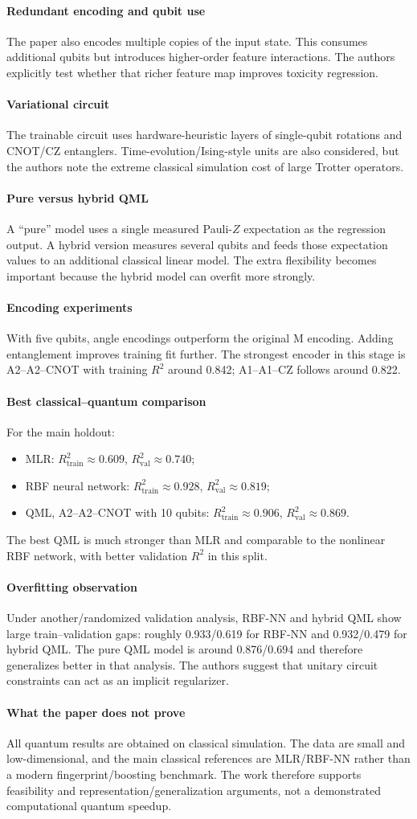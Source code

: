 \documentclass[11pt]{article}
\newcommand{\reviewfield}[2]{\paragraph{#1}#2}
\begin{document}
\reviewfield{Redundant encoding and qubit use}{
The paper also encodes multiple copies of the input state. This consumes additional qubits but introduces higher-order feature interactions. The authors explicitly test whether that richer feature map improves toxicity regression.
}

\reviewfield{Variational circuit}{
The trainable circuit uses hardware-heuristic layers of single-qubit rotations and CNOT/CZ entanglers. Time-evolution/Ising-style units are also considered, but the authors note the extreme classical simulation cost of large Trotter operators.
}

\reviewfield{Pure versus hybrid QML}{
A ``pure'' model uses a single measured Pauli-$Z$ expectation as the regression output. A hybrid version measures several qubits and feeds those expectation values to an additional classical linear model. The extra flexibility becomes important because the hybrid model can overfit more strongly.
}

\reviewfield{Encoding experiments}{
With five qubits, angle encodings outperform the original M encoding. Adding entanglement improves training fit further. The strongest encoder in this stage is A2--A2--CNOT with training $R^2$ around 0.842; A1--A1--CZ follows around 0.822.
}

\reviewfield{Best classical--quantum comparison}{
For the main holdout:
\begin{itemize}
    \item MLR: $R^2_{\mathrm{train}}\approx0.609$, $R^2_{\mathrm{val}}\approx0.740$;
    \item RBF neural network: $R^2_{\mathrm{train}}\approx0.928$, $R^2_{\mathrm{val}}\approx0.819$;
    \item QML, A2--A2--CNOT with 10 qubits: $R^2_{\mathrm{train}}\approx0.906$, $R^2_{\mathrm{val}}\approx0.869$.
\end{itemize}
The best QML is much stronger than MLR and comparable to the nonlinear RBF network, with better validation $R^2$ in this split.
}

\reviewfield{Overfitting observation}{
Under another/randomized validation analysis, RBF-NN and hybrid QML show large train--validation gaps: roughly 0.933/0.619 for RBF-NN and 0.932/0.479 for hybrid QML. The pure QML model is around 0.876/0.694 and therefore generalizes better in that analysis. The authors suggest that unitary circuit constraints can act as an implicit regularizer.
}

\reviewfield{What the paper does not prove}{
All quantum results are obtained on classical simulation. The data are small and low-dimensional, and the main classical references are MLR/RBF-NN rather than a modern fingerprint/boosting benchmark. The work therefore supports feasibility and representation/generalization arguments, not a demonstrated computational quantum speedup.
}
\end{document}
